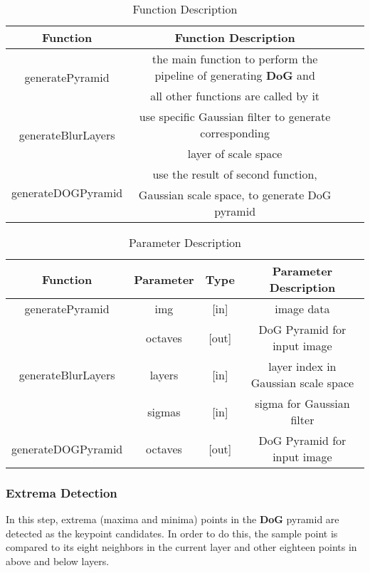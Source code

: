 \documentclass[paper=a4, fontsize=11pt]{scrartcl} %
\numberwithin{equation}{section} %
\numberwithin{figure}{section} %
\numberwithin{table}{section} %
\begin{document}
\begin{table}[h]
    \centering
    \begin{tabular}{|c|c| lp{}}
        \hline
        \textbf{Function} & \textbf{Function Description} \\\hline
          \multirow{2}{*}{generatePyramid} & the main function to perform the pipeline of generating \textbf{DoG} and \\ & all other 
                                           functions are called by it \\\hline
                                           \multirow{2}{*}{generateBlurLayers} & use specific Gaussian filter to generate corresponding \\ & layer of scale space\\\hline
                                           \multirow{2}{*}{generateDOGPyramid} & use the result of second function, \\&Gaussian scale space, to generate DoG pyramid\\\hline
    \end{tabular}
    \caption{Function Description}\label{nolock}
\end{table}

\begin{table}[h]
    \centering
    \begin{tabular}{|c|c|c|c|}
        \hline
        \textbf{Function} & \textbf{Parameter} & \textbf{Type} & \textbf{Parameter Description} \\\hline
        generatePyramid & img & [in] & image data  \\
                        & octaves &[out] & DoG Pyramid for input image \\\hline
     generateBlurLayers & layers & [in] & layer index in Gaussian scale space  \\
                        & sigmas & [in] & sigma for Gaussian filter\\\hline
     generateDOGPyramid & octaves & [out] & DoG Pyramid for input image\\\hline
    \end{tabular}
    \caption{Parameter Description}\label{nolock}
\end{table}

\subsubsection{Extrema Detection}

In this step, extrema (maxima and minima) points in the \textbf{DoG} pyramid are detected as the keypoint candidates. In order to do this, the sample point is compared to its eight neighbors in the current layer and other eighteen points in above and below layers.
\end{document}
